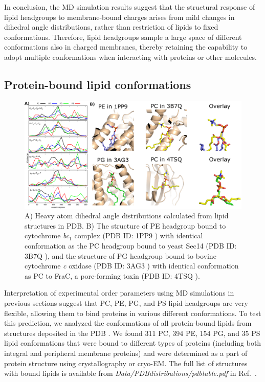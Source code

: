 \documentclass[aps,prl,superscriptaddress,twocolumn]{revtex4}
\begin{document}
In conclusion, the MD simulation results suggest that the structural response of lipid headgroups to 
membrane-bound charges arises
from mild changes in dihedral angle distributions, rather than restriction of lipids to
fixed conformations. Therefore, lipid headgroups sample a large space of different conformations
also in charged membranes, thereby retaining the capability to adopt multiple conformations when
interacting with proteins or other molecules.



\subsection{Protein-bound lipid conformations}

\begin{figure}[]
  \centering
  \includegraphics[width=19.0cm]{./Figs/figure4.eps}
  \caption{\label{dihedralsFROMpdb}
    A) Heavy atom dihedral angle distributions calculated from lipid structures in PDB.
    B) The structure of PE headgroup bound to cytochrome {\it bc}$_1$ complex (PDB ID: 1PP9 \cite{huang05})
    with identical conformation as the PC headgroup bound to yeast Sec14 (PDB ID: 3B7Q \cite{schaaf08}),
    and the structure of PG headgroup bound to bovine cytochrome {\it c} oxidase (PDB ID: 3AG3 \cite{muramoto10})
    with identical conformation as PC to FraC, a pore-forming toxin (PDB ID: 4TSQ \cite{tanaka15}).
  }
\end{figure}


Interpretation of experimental order parameters using MD simulations
in previous sections suggest that PC, PE, PG, and PS lipid headgroups are very flexible,
allowing them to bind proteins in various different conformations.
To test this prediction, we analyzed the conformations of all protein-bound lipids 
from structures deposited in the PDB \cite{berman00}.
We found 311 PC, 394 PE, 154 PG, and 35 PS lipid conformations that were bound to different types of proteins 
(including both integral and peripheral membrane proteins) and were determined as a part of protein structure using crystallography or cryo-EM. The full list of structures with bound lipids is available from {\it Data/PDBdistributions/pdbtable.pdf} in Ref.~\cite{NMRlipidsIVbgit}.
\end{document}
